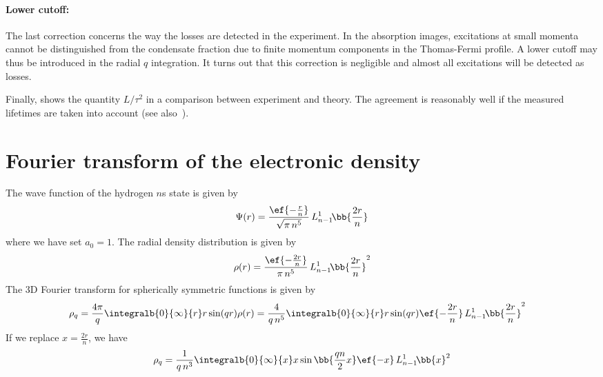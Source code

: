 \paragraph{Lower cutoff:}
The last correction concerns the way the losses are detected in the experiment. In the absorption images, excitations at small momenta cannot be distinguished from the condensate fraction due to finite momentum components in the Thomas-Fermi profile. A lower cutoff may thus be introduced in the radial $q$ integration. It turns out that this correction is negligible and almost all excitations will be detected as losses.

Finally,  shows the quantity $L/\tau^2$ in a comparison between experiment and theory. The agreement is reasonably well if the measured lifetimes are taken into account (see also~\cite{Karpiuk2014}).


\section{Fourier transform of the electronic density}
The wave function of the hydrogen $n$s state is given by
\begin{align}
\Psi(r)=\frac{\ef{-\frac{r}{n}}}{\sqrt{\pi\, n^5}} \, L_{n-1}^1\!\bb{\frac{2 r}{n}}
\end{align}
where we have set $a_0=1$. The radial density distribution is given by
\begin{align}
\rho(r)=\frac{\ef{-\frac{2r}{n}}}{\pi\, n^5} \, L_{n-1}^1\!\bb{\frac{2 r}{n}}^2
\end{align}
The 3D Fourier transform for spherically symmetric functions is given by
\begin{align}
\rho_q=\frac{4\pi}{q}\integralb{0}{\infty}{r} r \sin(qr) \rho(r)
&=\frac{4}{q\,n^5}\integralb{0}{\infty}{r} r \sin(qr) \ef{-\frac{2r}{n}} \, L_{n-1}^1\!\bb{\frac{2 r}{n}}^2
\end{align}
If we replace $x=\frac{2r}{n}$, we have
\begin{align}
\rho_q=\frac{1}{q\,n^3}\integralb{0}{\infty}{x} x \sin\bb{\frac{qn}{2}x} \ef{-x} \, L_{n-1}^1\!\bb{x}^2
\end{align}
